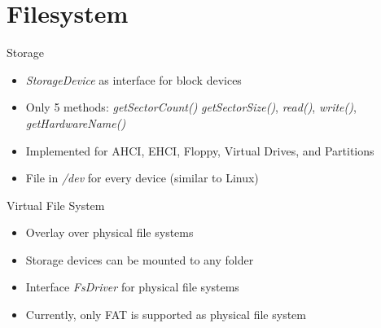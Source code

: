 \section{Filesystem}

\begin{frame}{Storage}
\begin{itemize}
	\item \textit{StorageDevice} as interface for block devices
	\item Only 5 methods: \textit{getSectorCount()} \textit{getSectorSize()}, \textit{read()}, \textit{write()}, \textit{getHardwareName()}
	\item Implemented for AHCI, EHCI, Floppy, Virtual Drives, and Partitions
	\item File in \textit{/dev} for every device (similar to Linux)
\end{itemize}	
\end{frame}

\begin{frame}{Virtual File System}
\begin{itemize}
	\item Overlay over physical file systems
	\item Storage devices can be mounted to any folder
	\item Interface \textit{FsDriver} for physical file systems
	\item Currently, only FAT is supported as physical file system
\end{itemize}	
\end{frame}
